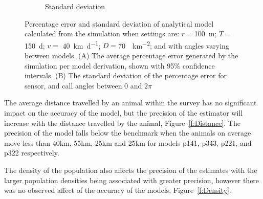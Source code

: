 \documentclass[a4paper,10pt,reqno,oneside]{amsart}
\begin{document}
\begin{figure}
\begin{subfigure}[t]{0.5\textwidth}
		\caption{Standard deviation}
		\label{f:StandardDevaition}
	\end{subfigure}
	\caption{Percentage error and standard deviation of analytical model calculated from the simulation when settings are: $r = $\SI{100}{\meter}; $T = $\SI{150}{\day}; $v = $ \SI{40}{\kilo\meter\per\day}; $D=$\SI{70}{\animals\per\kilo\meter\squared}; and with angles varying between models. (A) The average percentage error generated by the simulation per model derivation, shown with 95\% confidence intervals. (B) The standard deviation of the percentage error for sensor, and call angles between 0 and $2\pi$ }

\end{figure}


The average distance travelled by an animal within the survey has no significant impact on the accuracy of the model, but the precision of the estimator will increase with the distance travelled by the animal, Figure~\ref{f:Distance}. The precision of the model falls below the benchmark when the animals on average move less than 40km, 55km, 25km and 25km for models p141, p343, p221, and p322 respectively. 


The density of the population also affects the precision of the estimates with the larger population densities being associated with greater precision, however there was no observed affect of the accuracy of the models, Figure~\ref{f:Density}. 
\end{document}
